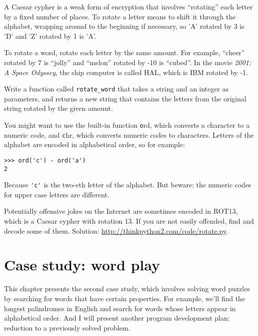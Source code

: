 \documentclass[
DIV=11,
fontsize=12,
twoside,
headinclude=false,
titlepage=firstiscover,
abstract=true,
headsepline=true,
footsepline=true,
chapterprefix=true, %
headings=big,
bibliography=totoc,%
captions=tableheading
]{scrbook}
\theoremstyle{definition}
\begin{document}
\begin{exercise}
\normalfont
{}

\label{exrotate}
A Caesar cypher is a weak form of encryption that involves ``rotating'' each
letter by a fixed number of places.  To rotate a letter means
to shift it through the alphabet, wrapping around to the beginning if
necessary, so 'A' rotated by 3 is 'D' and 'Z' rotated by 1 is 'A'.

To rotate a word, rotate each letter by the same amount.
For example, ``cheer'' rotated by 7 is ``jolly'' and ``melon'' rotated
by -10 is ``cubed''.  In the movie {\em 2001: A Space Odyssey}, the 
ship computer is called HAL, which is IBM rotated by -1.


Write a function called \verb"rotate_word"
that takes a string and an integer as parameters, and returns
a new string that contains the letters from the original string
rotated by the given amount.  

You might want to use the built-in function {\texttt ord}, which converts
a character to a numeric code, and {\texttt chr}, which converts numeric
codes to characters.  Letters of the alphabet are encoded in alphabetical
order, so for example:

\begin{lstlisting}
>>> ord('c') - ord('a')
2
\end{lstlisting}

Because \verb"'c'" is the two-eth letter of the alphabet.  But
beware: the numeric codes for upper case letters are different.

Potentially offensive jokes on the Internet are sometimes encoded in
ROT13, which is a Caesar cypher with rotation 13.  If you are not
easily offended, find and decode some of them.  Solution:
\url{http://thinkpython2.com/code/rotate.py}.

\end{exercise}


\chapter{Case study: word play}
\label{wordplay}

This chapter presents the second case study, which involves
solving word puzzles by searching for words that have certain
properties.  For example, we'll find the longest palindromes
in English and search for words whose letters appear in
alphabetical order.  And I will present another program development
plan: reduction to a previously solved problem.
\end{document}

